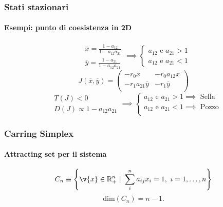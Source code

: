 \begin{frame}
\frametitle{Stati stazionari}
\framesubtitle{Esempi: punto di coesistenza in 2D}
\[\begin{aligned}
    & \overline{x}= \frac{1-a_{12}}{1-a_{12}a_{21}} \\
    & \overline{y}= \frac{1-a_{21}}{1-a_{12}a_{21}}
\end{aligned}
\implies 
\begin{cases}
    a_{12} \text{ e } a_{21} > 1\\
    a_{12} \text{ e } a_{21} < 1
\end{cases}
\] 
\vspace{1em}
\[
J(\overline{x}, \overline{y}) =\begin{pmatrix}
    - r_0\overline{x} &  -r_0a_{12}\overline{x}\\ 
    -r_1a_{21}\overline{y} & - r_1\overline{y} \\
\end{pmatrix}
\]
\vspace{1em}
\[\begin{aligned}
    & T(J)  < 0\\
    & D(J) \propto 1 - a_{12}a_{21}
\end{aligned}
\implies 
\begin{cases}
    a_{12} \text{ e } a_{21} > 1 \implies  \text{ Sella}\\
    a_{12} \text{ e } a_{21} < 1 \implies  \text{ Pozzo}\\
\end{cases}
\]
\end{frame}

\begin{frame}
\frametitle{Carring Simplex}
\framesubtitle{Attracting set per il sistema}
\begin{equation}
    C_n \equiv  \left\{\v{x}\in \mathbb{R}^n_+ \ | \ \sum_{i}^{n} a_{ij} x_i = 1, \ i = 1, \ldots, n\right\}
    \label{eq:CS}
\end{equation}
\vspace{2em}
\[
    \text{dim}(C_n) = n-1
.\] 
\end{frame}

